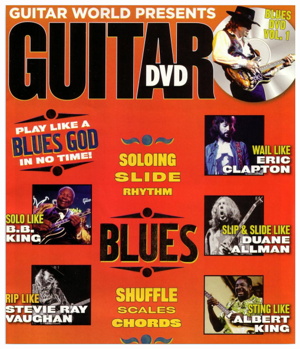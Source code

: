 \documentclass[a4paper]{book}
\begin{document}
\begin{center}
\includegraphics[width=13.042cm,height=15.212cm]{lebluessupportsmethodes-img98.png}
\end{center}






\clearpage
\end{document}

